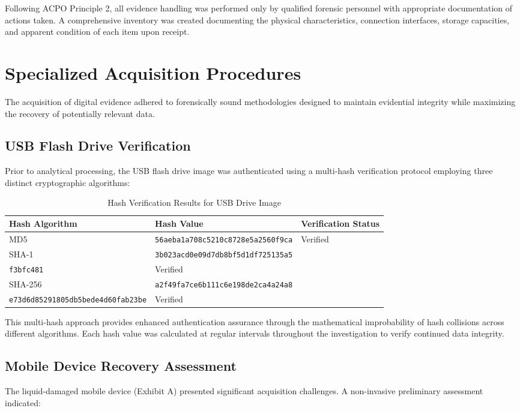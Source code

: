 Following ACPO Principle 2, all evidence handling was performed only by qualified forensic personnel with appropriate documentation of actions taken. A comprehensive inventory was created documenting the physical characteristics, connection interfaces, storage capacities, and apparent condition of each item upon receipt.

\section{Specialized Acquisition Procedures}
The acquisition of digital evidence adhered to forensically sound methodologies designed to maintain evidential integrity while maximizing the recovery of potentially relevant data.

\subsection{USB Flash Drive Verification}
Prior to analytical processing, the USB flash drive image was authenticated using a multi-hash verification protocol employing three distinct cryptographic algorithms:

\begin{table}[h]
\centering
\begin{tabular}{|p{3cm}|p{8cm}|p{3cm}|}
\hline
\textbf{Hash Algorithm} & \textbf{Hash Value} & \textbf{Verification Status} \\
\hline
MD5 & \texttt{56aeba1a708c5210c8728e5a2560f9ca}  & Verified \\
\hline
SHA-1 & \texttt{3b023acd0e09d7db8bf5d1df725135a5}\\\texttt{f3bfc481} & Verified \\
\hline
SHA-256 & \texttt{a2f49fa7ce6b111c6e198de2ca4a24a8}\\\texttt{e73d6d85291805db5bede4d60fab23be}  & Verified \\
\hline
\end{tabular}
\caption{Hash Verification Results for USB Drive Image}
\label{tab:hash_verification_acq}
\end{table}

This multi-hash approach provides enhanced authentication assurance through the mathematical improbability of hash collisions across different algorithms. Each hash value was calculated at regular intervals throughout the investigation to verify continued data integrity.

\subsection{Mobile Device Recovery Assessment}
The liquid-damaged mobile device (Exhibit A) presented significant acquisition challenges. A non-invasive preliminary assessment indicated:


